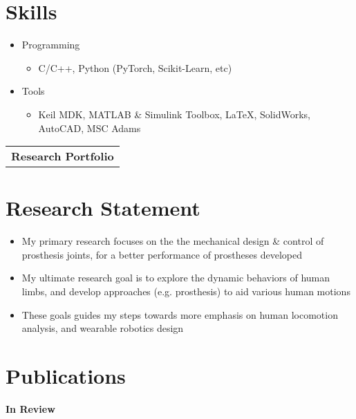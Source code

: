 \documentclass[letter,12pt]{article}
\begin{document}
\section{Skills}
\begin{itemize}[nosep,after=\strut, leftmargin=1em, itemsep=3pt]
    \item{Programming}
    \begin{itemize}
        \item C/C++, Python (PyTorch, Scikit-Learn, etc) 
    \end{itemize}
    \item{Tools}
    \begin{itemize}
        \item Keil MDK, MATLAB \& Simulink Toolbox, LaTeX, SolidWorks, AutoCAD, MSC Adams 
    \end{itemize}
\end{itemize}


\begin{comment}

\end{comment}


\newpage


\begin{tabularx}{\linewidth}{@{} C @{}}
    \Huge{\textbf{Research Portfolio}} \\[7.5pt]
    \end{tabularx}

\section{Research Statement}

\begin{itemize}

    \item {My primary research focuses on the the mechanical design \& control of prosthesis joints, for a better performance of prostheses developed}
    \item {My ultimate research goal is to explore the dynamic behaviors of human limbs, and develop approaches (e.g. prosthesis) to aid various human motions} 
    \item {These goals guides my steps towards more emphasis on human locomotion analysis, and wearable robotics design}

\end{itemize}

\section{Publications}

\large \textbf{In Review} \hfill \\
\begin{refsection}
    \nocite{*}
    \printbibliography[heading=none]
\end{refsection}
\end{document}

